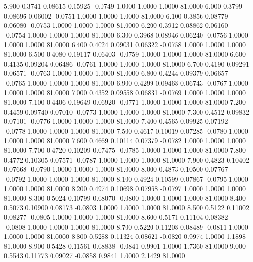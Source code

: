    5.900   0.3741   0.08615   0.05925  -0.0749   1.0000   1.0000   1.0000  81.0000
   6.000   0.3799   0.08696   0.06002  -0.0751   1.0000   1.0000   1.0000  81.0000
   6.100   0.3856   0.08779   0.06080  -0.0753   1.0000   1.0000   1.0000  81.0000
   6.200   0.3912   0.08862   0.06160  -0.0754   1.0000   1.0000   1.0000  81.0000
   6.300   0.3968   0.08946   0.06240  -0.0756   1.0000   1.0000   1.0000  81.0000
   6.400   0.4024   0.09031   0.06322  -0.0758   1.0000   1.0000   1.0000  81.0000
   6.500   0.4080   0.09117   0.06403  -0.0759   1.0000   1.0000   1.0000  81.0000
   6.600   0.4135   0.09204   0.06486  -0.0761   1.0000   1.0000   1.0000  81.0000
   6.700   0.4190   0.09291   0.06571  -0.0763   1.0000   1.0000   1.0000  81.0000
   6.800   0.4244   0.09379   0.06657  -0.0765   1.0000   1.0000   1.0000  81.0000
   6.900   0.4299   0.09468   0.06743  -0.0767   1.0000   1.0000   1.0000  81.0000
   7.000   0.4352   0.09558   0.06831  -0.0769   1.0000   1.0000   1.0000  81.0000
   7.100   0.4406   0.09649   0.06920  -0.0771   1.0000   1.0000   1.0000  81.0000
   7.200   0.4459   0.09740   0.07010  -0.0773   1.0000   1.0000   1.0000  81.0000
   7.300   0.4512   0.09832   0.07101  -0.0776   1.0000   1.0000   1.0000  81.0000
   7.400   0.4565   0.09925   0.07192  -0.0778   1.0000   1.0000   1.0000  81.0000
   7.500   0.4617   0.10019   0.07285  -0.0780   1.0000   1.0000   1.0000  81.0000
   7.600   0.4669   0.10114   0.07379  -0.0782   1.0000   1.0000   1.0000  81.0000
   7.700   0.4720   0.10209   0.07475  -0.0785   1.0000   1.0000   1.0000  81.0000
   7.800   0.4772   0.10305   0.07571  -0.0787   1.0000   1.0000   1.0000  81.0000
   7.900   0.4823   0.10402   0.07668  -0.0790   1.0000   1.0000   1.0000  81.0000
   8.000   0.4873   0.10500   0.07767  -0.0792   1.0000   1.0000   1.0000  81.0000
   8.100   0.4924   0.10599   0.07867  -0.0795   1.0000   1.0000   1.0000  81.0000
   8.200   0.4974   0.10698   0.07968  -0.0797   1.0000   1.0000   1.0000  81.0000
   8.300   0.5024   0.10799   0.08070  -0.0800   1.0000   1.0000   1.0000  81.0000
   8.400   0.5073   0.10900   0.08173  -0.0803   1.0000   1.0000   1.0000  81.0000
   8.500   0.5122   0.11002   0.08277  -0.0805   1.0000   1.0000   1.0000  81.0000
   8.600   0.5171   0.11104   0.08382  -0.0808   1.0000   1.0000   1.0000  81.0000
   8.700   0.5220   0.11208   0.08489  -0.0811   1.0000   1.0000   1.0000  81.0000
   8.800   0.5288   0.11324   0.08621  -0.0820   0.9974   1.0000   1.1898  81.0000
   8.900   0.5428   0.11561   0.08838  -0.0841   0.9901   1.0000   1.7360  81.0000
   9.000   0.5543   0.11773   0.09027  -0.0858   0.9841   1.0000   2.1429  81.0000
